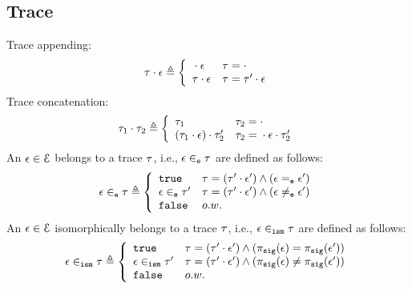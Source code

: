 %
\subsection{Trace}
Trace appending:
\[
  \trace \cdot \event \triangleq
  \left\{
  \begin{array}{ll} 
    {} \cdot \event           & \trace =  \cdot \\
    \trace \cdot \event    & \trace =  \trace' \cdot \event\\ 
  \end{array}
  \right.
\]
%
Trace concatenation:
\[
  \trace_1 \cdot \trace_2 \triangleq
  \left\{
  \begin{array}{ll} 
    \trace_1                                  & \trace_2 =  \cdot \\
    (\trace_1 \cdot \event) \cdot \trace_2'    & \trace_2 =  {} \cdot \event \cdot \trace_2'\\ 
  \end{array}
  \right.
\]
%
An $\mathtt{\epsilon} \in \mathcal{E}$ belongs to a trace $\mathtt{\tau}$, i.e., $\mathtt{\epsilon} \in_{\mathtt{e}} \mathtt{\tau}$ are defined as follows:
%
\begin{equation}
  \event \eventin \trace  
  \triangleq \left\{
  \begin{array}{ll} 
    \etrue                  & \trace =  (\trace' \cdot \event') \land (\event \eventeq \event') \\
    \event \eventin \trace' & \trace =  (\trace' \cdot \event') \land (\event \eventneq \event') \\ 
    \efalse                 & o.w.
  \end{array}
  \right.
\end{equation}
%
An $\mathtt{\epsilon} \in \mathcal{E}$ isomorphically belongs to a trace $\mathtt{\tau}$, i.e., $\mathtt{\epsilon} \in_{\mathtt{ism}} \mathtt{\tau}$ are defined as follows:
\begin{equation}
  \event \ismin \trace  
  \triangleq \left\{
  \begin{array}{ll} 
    \etrue                  & \trace =  (\trace' \cdot \event') 
    \land (\pi_{\sig}(\event) = \pi_{\sig}(\event')) \\
    \event \ismin \trace'   & \trace =  (\trace' \cdot \event') \land (\pi_{\sig}(\event) \neq \pi_{\sig}(\event') ) \\ 
    \efalse                 & o.w.
  \end{array}
  \right.
\end{equation}
%
%
%
